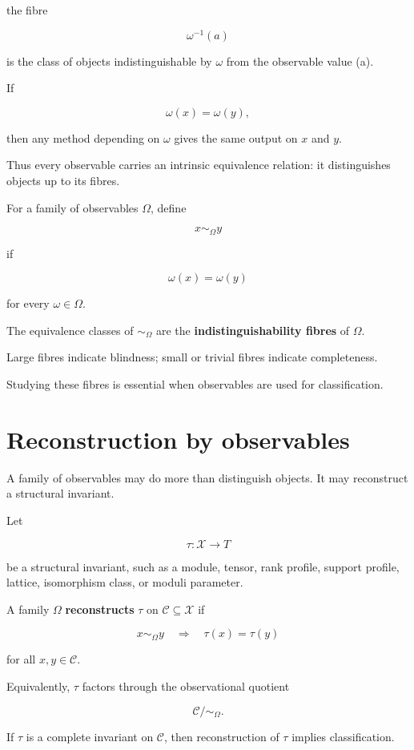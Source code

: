 \documentclass[11pt]{article}
\begin{document}
the fibre

\[
\omega^{-1}(a)
\]

is the class of objects indistinguishable by \(\omega\) from the observable value (a).

If

\[
\omega(x)=\omega(y),
\]

then any method depending on \(\omega\) gives the same output on \(x\) and \(y\).

Thus every observable carries an intrinsic equivalence relation: it distinguishes objects up to its fibres.

For a family of observables \(\Omega\), define

\[
x\sim_\Omega y
\]

if

\[
\omega(x)=\omega(y)
\]

for every \(\omega\in\Omega\).

The equivalence classes of \(\sim_\Omega\) are the \textbf{indistinguishability fibres} of \(\Omega\).

Large fibres indicate blindness; small or trivial fibres indicate completeness.

Studying these fibres is essential when observables are used for classification.


\section{Reconstruction by observables}

A family of observables may do more than distinguish objects. It may reconstruct a structural invariant.

Let

\[
\tau:\mathcal X\to T
\]

be a structural invariant, such as a module, tensor, rank profile, support profile, lattice, isomorphism class, or moduli parameter.

A family \(\Omega\) \textbf{reconstructs} \(\tau\) on \(\mathcal C\subseteq\mathcal X\) if

\[
x\sim_\Omega y
\quad\Longrightarrow\quad
\tau(x)=\tau(y)
\]

for all \(x,y\in\mathcal C\).

Equivalently, \(\tau\) factors through the observational quotient

\[
\mathcal C/\!\sim_\Omega.
\]

If \(\tau\) is a complete invariant on \(\mathcal C\), then reconstruction of \(\tau\) implies classification.
\end{document}

